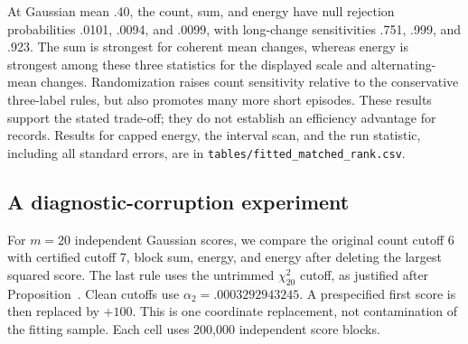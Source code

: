 \documentclass[11pt]{article}
\makeatletter
\DeclareRobustCommand{\MainRef}[2]{\hyper@linkfile{#2}{main.pdf}{#1}}
\theoremstyle{definition}
\theoremstyle{remark}
\newcommand{\1}{\mathbf 1}
\makeatother
\begin{document}
At Gaussian mean .40, the count, sum, and energy have null rejection probabilities .0101, .0094, and .0099, with long-change sensitivities .751, .999, and .923. The sum is strongest for coherent mean changes, whereas energy is strongest among these three statistics for the displayed scale and alternating-mean changes. Randomization raises count sensitivity relative to the conservative three-label rules, but also promotes many more short episodes. These results support the stated trade-off; they do not establish an efficiency advantage for records. Results for capped energy, the interval scan, and the run statistic, including all standard errors, are in \texttt{tables/fitted\_matched\_rank.csv}.

\FloatBarrier
\subsection{A diagnostic-corruption experiment}\label{subsec:robustsimulation}\hypertarget{app:robustsimulation}{}

For \(m=20\) independent Gaussian scores, we compare the original count cutoff 6 with certified cutoff 7, block sum, energy, and energy after deleting the largest squared score. The last rule uses the untrimmed \(\chi^2_{20}\) cutoff, as justified after Proposition~\MainRef{theorem.3.14}{3.14}. Clean cutoffs use \(\alpha_2=.0003292943245\). A prespecified first score is then replaced by \(+100\). This is one coordinate replacement, not contamination of the fitting sample. Each cell uses 200,000 independent score blocks.
\end{document}
